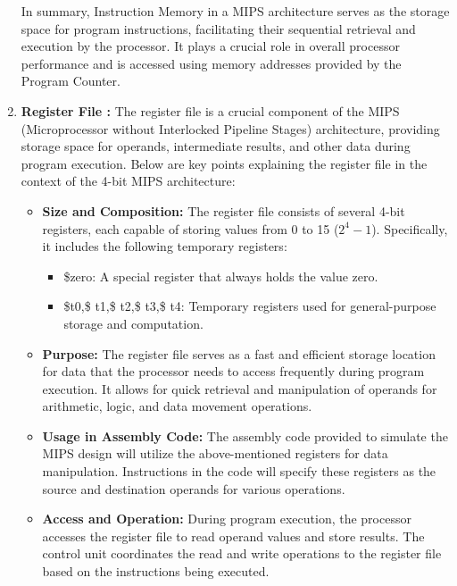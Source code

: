 \documentclass{article}
\begin{document}
\begin{enumerate}
			In summary, Instruction Memory in a MIPS architecture serves as the storage space for program instructions, facilitating their sequential retrieval and execution by the processor. It plays a crucial role in overall processor performance and is accessed using memory addresses provided by the Program Counter.
			\item \textbf{Register File : }
			The register file is a crucial component of the MIPS (Microprocessor without Interlocked Pipeline Stages) architecture, providing storage space for operands, intermediate results, and other data during program execution. Below are key points explaining the register file in the context of the 4-bit MIPS architecture:
			
			\begin{itemize}
				
				\item \textbf{Size and Composition:} The register file consists of several 4-bit registers, each capable of storing values from 0 to 15 ($2^4 - 1$). Specifically, it includes the following temporary registers:
				\begin{itemize}
					\item \$zero: A special register that always holds the value zero.
					\item \$t0,\$ t1,\$ t2,\$ t3,\$ t4: Temporary registers used for general-purpose storage and computation.
				\end{itemize}
				
				\item \textbf{Purpose:} The register file serves as a fast and efficient storage location for data that the processor needs to access frequently during program execution. It allows for quick retrieval and manipulation of operands for arithmetic, logic, and data movement operations.
				
				\item \textbf{Usage in Assembly Code:} The assembly code provided to simulate the MIPS design will utilize the above-mentioned registers for data manipulation. Instructions in the code will specify these registers as the source and destination operands for various operations.
				
				\item \textbf{Access and Operation:} During program execution, the processor accesses the register file to read operand values and store results. The control unit coordinates the read and write operations to the register file based on the instructions being executed.
				

\end{itemize}
\end{enumerate}
\end{document}
